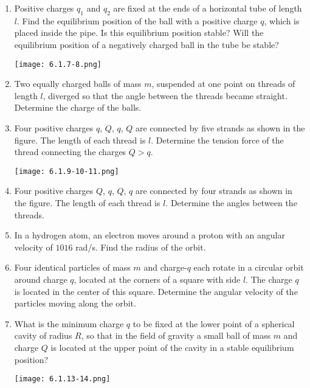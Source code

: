 \documentclass{article}
\begin{document}
\begin{enumerate}[label=6.1.\arabic*]
\item Positive charges $q_1$ and $q_2$ are fixed at the ends of a horizontal tube of length $l$. Find the equilibrium position of the ball with a positive charge $q$, which is placed inside the pipe. Is this equilibrium position stable? Will the equilibrium position of a negatively charged ball in the tube be stable? 

\begin{center}
    \texttt{[image: 6.1.7-8.png]}
\end{center}



\item Two equally charged balls of mass $m$, suspended at one point on threads of length $l$, diverged so that the angle between the threads became straight. Determine the charge of the balls.

\item Four positive charges $q$, $Q$, $q$, $Q$ are connected by five strands as shown in the figure. The length of each thread is $l$. Determine the tension force of the thread connecting the charges $Q > q$.

\begin{center}
    \texttt{[image: 6.1.9-10-11.png]}
\end{center}


\item Four positive charges $Q$, $q$, $Q$, $q$ are connected by four strands as shown in the figure. The length of each thread is $l$. Determine the angles between the threads.

\item In a hydrogen atom, an electron moves around a proton with an angular velocity of $1016$ rad/s. Find the radius of the orbit.

\item Four identical particles of mass $m$ and charge-$q$ each rotate in a circular orbit around charge $q$, located at the corners of a square with side $l$. The charge $q$ is located in the center of this square. Determine the angular velocity of the particles moving along the orbit.

\item What is the minimum charge $q$ to be fixed at the lower point of a spherical cavity of radius $R$, so that in the field of gravity a small ball of mass $m$ and charge $Q$ is located at the upper point of the cavity in a stable equilibrium position?

\begin{center}
    \texttt{[image: 6.1.13-14.png]}
\end{center}



\end{enumerate}
\end{document}
